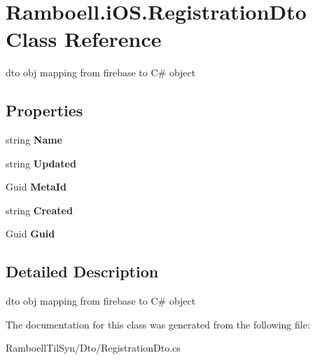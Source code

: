 \hypertarget{class_ramboell_1_1i_o_s_1_1_registration_dto}{}\section{Ramboell.\+i\+O\+S.\+Registration\+Dto Class Reference}
\label{class_ramboell_1_1i_o_s_1_1_registration_dto}


dto obj mapping from firebase to C\# object  


\subsection*{Properties}
\begin{DoxyCompactItemize}
\item 
\mbox{\label{class_ramboell_1_1i_o_s_1_1_registration_dto_ae921da434b8e1753e13375b7d011e419}} 
string {\bfseries Name}
\item 
\mbox{\label{class_ramboell_1_1i_o_s_1_1_registration_dto_ad58506331763c8b3e97745cd5f366ed7}} 
string {\bfseries Updated}
\item 
\mbox{\label{class_ramboell_1_1i_o_s_1_1_registration_dto_adf3aa0fab618ded3f6787c0b2165ecf0}} 
Guid {\bfseries Meta\+Id}
\item 
\mbox{\label{class_ramboell_1_1i_o_s_1_1_registration_dto_a368705703f65af64aa3ecb996824ca56}} 
string {\bfseries Created}
\item 
\mbox{\label{class_ramboell_1_1i_o_s_1_1_registration_dto_a1e9a7b07f39441d33e172fed7c593220}} 
Guid {\bfseries Guid}
\end{DoxyCompactItemize}


\subsection{Detailed Description}
dto obj mapping from firebase to C\# object 



The documentation for this class was generated from the following file\+:\begin{DoxyCompactItemize}
\item 
Ramboell\+Til\+Syn/\+Dto/Registration\+Dto.\+cs\end{DoxyCompactItemize}
